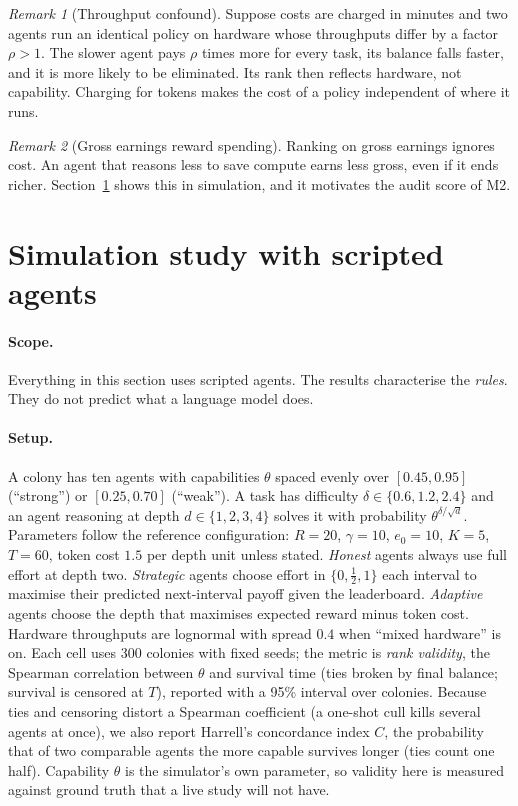 \documentclass[11pt]{article}
\theoremstyle{plain}
\theoremstyle{remark}
\newtheorem{remark}{Remark}
\begin{document}
\begin{remark}[Throughput confound]\label{rem:hw}
Suppose costs are charged in minutes and two agents run an identical policy on hardware whose throughputs differ by a factor $\rho>1$. The slower agent pays $\rho$ times more for every task, its balance falls faster, and it is more likely to be eliminated. Its rank then reflects hardware, not capability. Charging for tokens makes the cost of a policy independent of where it runs.
\end{remark}

\begin{remark}[Gross earnings reward spending]\label{rem:gross}
Ranking on gross earnings ignores cost. An agent that reasons less to save compute earns less gross, even if it ends richer. Section~\ref{sec:sim} shows this in simulation, and it motivates the audit score of M2.
\end{remark}

\section{Simulation study with scripted agents}
\label{sec:sim}

\paragraph{Scope.}
Everything in this section uses scripted agents. The results characterise the \emph{rules}. They do not predict what a language model does.

\paragraph{Setup.}
A colony has ten agents with capabilities $\theta$ spaced evenly over $[0.45,0.95]$ (``strong'') or $[0.25,0.70]$ (``weak''). A task has difficulty $\delta\in\{0.6,1.2,2.4\}$ and an agent reasoning at depth $d\in\{1,2,3,4\}$ solves it with probability $\theta^{\delta/\sqrt d}$. Parameters follow the reference configuration: $R=20$, $\gamma=10$, $e_0=10$, $K=5$, $T=60$, token cost $1.5$ per depth unit unless stated. \emph{Honest} agents always use full effort at depth two. \emph{Strategic} agents choose effort in $\{0,\tfrac12,1\}$ each interval to maximise their predicted next-interval payoff given the leaderboard. \emph{Adaptive} agents choose the depth that maximises expected reward minus token cost. Hardware throughputs are lognormal with spread $0.4$ when ``mixed hardware'' is on. Each cell uses 300 colonies with fixed seeds; the metric is \emph{rank validity}, the Spearman correlation between $\theta$ and survival time (ties broken by final balance; survival is censored at $T$), reported with a 95\% interval over colonies. Because ties and censoring distort a Spearman coefficient (a one-shot cull kills several agents at once), we also report Harrell's concordance index $C$, the probability that of two comparable agents the more capable survives longer (ties count one half). Capability $\theta$ is the simulator's own parameter, so validity here is measured against ground truth that a live study will not have.
\end{document}
